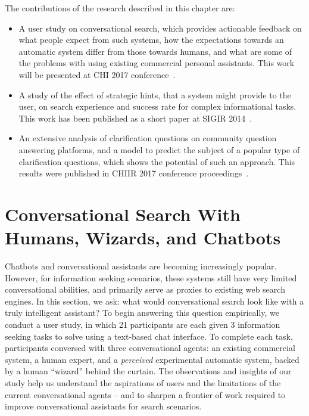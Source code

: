 The contributions of the research described in this chapter are:
\begin{itemize}
\item A user study on conversational search, which provides actionable feedback on what people expect from such systems, how the expectations towards an automatic system differ from those towards humans, and what are some of the problems with using existing commercial personal assistants.
This work will be presented at CHI 2017 conference~\cite{vtyurina2017convsearch}.
\item A study of the effect of strategic hints, that a system might provide to the user, on search experience and success rate for complex informational tasks.
This work has been published as a short paper at SIGIR 2014~\cite{savenkov2014hint}.
\item An extensive analysis of clarification questions on community question answering platforms, and a model to predict the subject of a popular type of clarification questions, which shows the potential of such an approach.
This results were published in CHIIR 2017 conference proceedings~\cite{braslavski2017clarq}.
\end{itemize}

\section{Conversational Search With Humans, Wizards, and Chatbots}
\label{section:conversation:user-study}

Chatbots and conversational assistants are becoming increasingly popular.
However, for information seeking scenarios, these systems still have very limited conversational abilities, and primarily serve as proxies to existing web search engines.
In this section, we ask: what would conversational search look like with a truly intelligent assistant?
To begin answering this question empirically, we conduct a user study, in which 21 participants are each given 3 information seeking tasks to solve using a text-based chat interface.
To complete each task, participants conversed with three conversational agents: an existing commercial system, a human expert, and a \textit{perceived} experimental automatic system, backed by a human ``wizard'' behind the curtain.
The observations and insights of our study help us understand the aspirations of users and the limitations of the current conversational agents -- and to sharpen a frontier of work required to improve conversational assistants for search scenarios.

